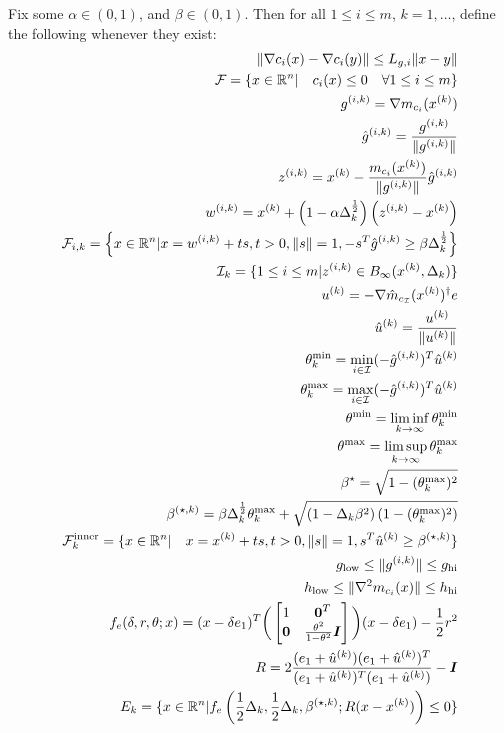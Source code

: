 Fix some $\alpha \in (0, 1)$, and $\beta \in (0, 1)$.
Then for all $1 \le i \le m$, $k = 1, \ldots$, define the following whenever they exist:
\begin{align*}
\|\nabla c_i(x) - \nabla c_i(y)\| \le {L_{g, i}} \|x - y\| \\
{\mathcal F} = \{x \in {\mathbb R^{n}} | \quad c_i(x) \le 0\quad \forall 1 \le i \le m \} \\
{g^{(i, k)}} = \nabla m_{c_i}({x^{(k)}}) \\ 
{{\hat g}^{(i, k)}} = \frac{{g^{(i, k)}}}{\|{g^{(i, k)}}\|} \\
{z^{(i, k)}} = {x^{(k)}} - \frac{m_{c_i}({x^{(k)}})}{\|{g^{(i, k)}}\|}{{\hat g}^{(i, k)}} \\
{w^{(i, k)}} = {x^{(k)}} + \left(1 - \alpha\Delta_k^{\frac 1 2}\right)\left({z^{(i, k)}} - {x^{(k)}}\right) \\
{\mathcal F_{i, k}} = \left\{x \in {\mathbb R^{n}} | x = {w^{(i, k)}} + t s,t > 0, \|s\| = 1, -s^T{{\hat g}^{(i, k)}} \ge \beta \Delta_k^{\frac 1 2 }\right\} \\
{\mathcal I_{k}} = \{1\le i \le m | {z^{(i, k)}} \in B_{\infty}({x^{(k)}}, \Delta_k) \} \\
{u^{(k)}} = -\nabla \hat m_{c_{\mathcal I}}({x^{(k)}})^{\dagger} e\\
{{\hat u}^{(k)}} = \frac {{u^{(k)}}} {\| {u^{(k)}}\|}\\
\theta^{\text{min}}_k = \min_{i \in \mathcal I} (-{{\hat g}^{(i, k)}})^T {{\hat u}^{(k)}} \\
\theta^{\text{max}}_k = \max_{i \in \mathcal I} (-{{\hat g}^{(i, k)}})^T {{\hat u}^{(k)}} \\
\theta^{\text{min}} = \liminf_{k\to\infty} \theta^{\text{min}}_k\\
\theta^{\text{max}} = \limsup_{k\to\infty} \theta^{\text{max}}_k\\
{\beta^{\star}} = \sqrt{ 1 - (\theta^{\text{max}}_k)^2}\\
{\beta^{(\star, k)}} = \beta\Delta_k^{\frac 1 2} \theta^{\text{max}}_k + \sqrt{(1 - \Delta_k\beta^2)\left(1 - (\theta^{\text{max}}_k) ^2\right)} \\
{\mathcal {F}^{\text{inner}}_k} = \{x \in {\mathbb R^{n}} | \quad x = {x^{(k)}} + ts, t > 0, \|s\| = 1, s^T{{\hat u}^{(k)}} \ge {\beta^{(\star, k)}} \} \\
g_{\text{low}} \le \|{g^{(i, k)}}\| \le g_{\text{hi}} \\
h_{\text{low}} \le \|\nabla^2m_{c_i}(x)\| \le h_{\text{hi}} \\
f_e(\delta, r, \theta; x) = (x - \delta e_1)^T\bigg(\begin{bmatrix}
1 & \boldsymbol0^T \\
\boldsymbol 0 & \frac{\theta^2}{1 - \theta^2} \boldsymbol I \\
\end{bmatrix}\bigg)(x - \delta e_1) - \frac 1 2 r^2 \\
R = 2\frac{(e_1 + {{\hat u}^{(k)}})(e_1 + {{\hat u}^{(k)}})^T}{(e_1 + {{\hat u}^{(k)}})^T(e_1 + {{\hat u}^{(k)}})} - \boldsymbol I \\
E_k = \{x \in {\mathbb R^{n}} | f_e\left(\frac 1 2 \Delta_k, \frac 1 2 \Delta_k, {\beta^{(\star, k)}}; R(x - {x^{(k)}})\right) \le 0\}
\end{align*}


